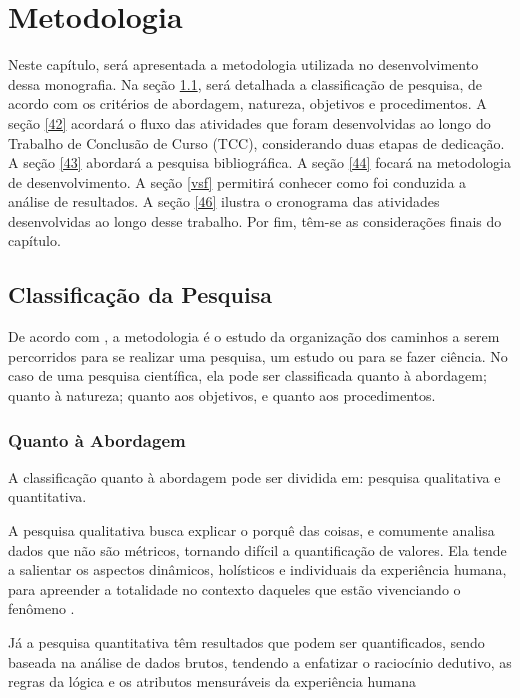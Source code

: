 \chapter[Metodologia]{Metodologia}
\label{ch:metodologia}

Neste capítulo, será apresentada a metodologia utilizada no desenvolvimento dessa 
monografia. Na seção \ref{41}, será detalhada a classificação de pesquisa, de acordo com os 
critérios de abordagem, natureza, objetivos e procedimentos. A seção \ref{42} acordará o fluxo 
das atividades que foram desenvolvidas ao longo do Trabalho de Conclusão de Curso (TCC), considerando duas etapas de dedicação. 
A seção \ref{43} abordará a pesquisa bibliográfica.
A seção \ref{44} focará na metodologia de desenvolvimento. A seção \ref{vsf} permitirá conhecer como foi conduzida 
a análise de resultados. A seção \ref{46} ilustra o cronograma das atividades desenvolvidas ao 
longo desse trabalho. Por fim, têm-se as considerações finais do capítulo.


\section{Classificação da Pesquisa}
\label{41}
De acordo com , a metodologia é o estudo da organização dos 
caminhos a serem percorridos para se realizar uma pesquisa, um estudo ou para se 
fazer ciência. No caso de uma pesquisa científica, ela pode ser classificada quanto à 
abordagem; quanto à natureza; quanto aos objetivos, e quanto aos procedimentos.

\subsection{Quanto à Abordagem}

A classificação quanto à abordagem pode ser dividida em: pesquisa qualitativa e quantitativa. 

A pesquisa qualitativa busca explicar o porquê das coisas, e 
comumente analisa dados que não são métricos, tornando difícil 
a quantificação de valores. Ela tende a salientar os
aspectos dinâmicos, holísticos e individuais da experiência humana, para apreender
a totalidade no contexto daqueles que estão vivenciando o fenômeno \cite{gerhardt2009}.

Já a pesquisa quantitativa têm resultados que podem ser quantificados, sendo baseada na 
análise de dados brutos, tendendo a enfatizar o raciocínio dedutivo, as regras da lógica 
e os atributos mensuráveis da experiência humana

